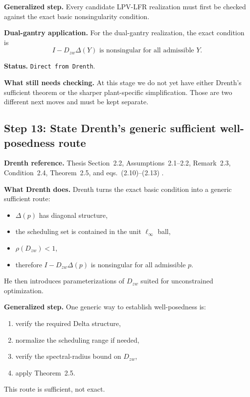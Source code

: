 ﻿\documentclass[11pt]{article}
\newcommand{\audititem}[2]{\par\smallskip\noindent\textbf{#1.} #2\par}
\newcommand{\statusline}[1]{\texttt{#1}}
\begin{document}
\audititem{Generalized step}{Every candidate LPV-LFR realization must first be
checked against the exact basic nonsingularity condition.}

\audititem{Dual-gantry application}{For the dual-gantry realization, the exact
condition is
\begin{equation}
    I - D_{zw}\Delta(Y) \text{ is nonsingular for all admissible } Y.
    \label{eqv:wpbasic}
\end{equation}}

\audititem{Status}{\statusline{Direct from Drenth}.}

\audititem{What still needs checking}{At this stage we do not yet have either
Drenth's sufficient theorem or the sharper plant-specific simplification. Those
are two different next moves and must be kept separate.}

\subsection{Step 13: State Drenth's generic sufficient well-posedness route}

\audititem{Drenth reference}{Thesis Section~2.2, Assumptions~2.1--2.2,
Remark~2.3, Condition~2.4, Theorem~2.5, and eqs.~(2.10)--(2.13)
\cite{drenth2025thesis}.}

\audititem{What Drenth does}{Drenth turns the exact basic condition into a
generic sufficient route:
\begin{itemize}[leftmargin=1.2em]
    \item $\Delta(p)$ has diagonal structure,
    \item the scheduling set is contained in the unit $\ell_\infty$ ball,
    \item $\rho(D_{zw}) < 1$,
    \item therefore $I - D_{zw}\Delta(p)$ is nonsingular for all admissible $p$.
\end{itemize}
He then introduces parameterizations of $D_{zw}$ suited for unconstrained
optimization.}

\audititem{Generalized step}{One generic way to establish well-posedness is:
\begin{enumerate}[leftmargin=1.4em,label=\arabic*.]
    \item verify the required Delta structure,
    \item normalize the scheduling range if needed,
    \item verify the spectral-radius bound on $D_{zw}$,
    \item apply Theorem~2.5.
\end{enumerate}
This route is sufficient, not exact.}
\end{document}

